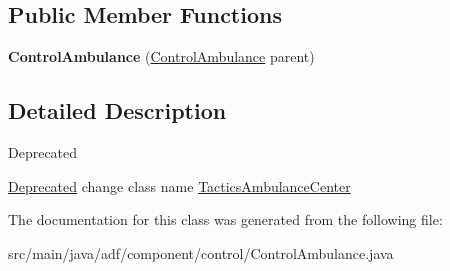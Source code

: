 \subsection*{Public Member Functions}
\begin{DoxyCompactItemize}
\item 
\hypertarget{classadf_1_1component_1_1control_1_1ControlAmbulance_ade5e6a6110e83443fbef51dec9d2723b}{}\label{classadf_1_1component_1_1control_1_1ControlAmbulance_ade5e6a6110e83443fbef51dec9d2723b} 
{\bfseries Control\+Ambulance} (\hyperlink{classadf_1_1component_1_1control_1_1ControlAmbulance}{Control\+Ambulance} parent)
\end{DoxyCompactItemize}


\subsection{Detailed Description}
\begin{DoxyRefDesc}{Deprecated}
\item[\hyperlink{deprecated__deprecated000010}{Deprecated}]change class name \hyperlink{}{Tactics\+Ambulance\+Center} \end{DoxyRefDesc}


The documentation for this class was generated from the following file\+:\begin{DoxyCompactItemize}
\item 
src/main/java/adf/component/control/Control\+Ambulance.\+java\end{DoxyCompactItemize}
